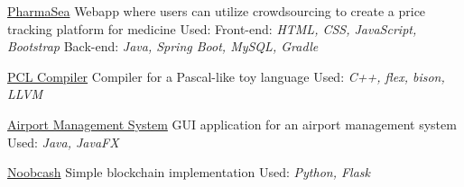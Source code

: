 \documentclass[11pt,a4paper,sans]{moderncv} %
\begin{document}
\cventry{}
{\href{https://github.com/Nickgraviton/pharmasea}{PharmaSea}}
{\newline Webapp where users can utilize crowdsourcing to create a price tracking platform for medicine}
{\newline Used:
\newline Front-end: \emph{HTML, CSS, JavaScript, Bootstrap}
\newline Back-end: \emph{Java, Spring Boot, MySQL, Gradle}}{}{}

\cventry{}
{\href{https://github.com/Nickgraviton/pcl-compiler}{PCL Compiler}}
{\newline Compiler for a Pascal-like toy language}
{\newline Used: \emph{C++, flex, bison, LLVM}}{}{}

\cventry{}
{\href{https://github.com/Nickgraviton/airport-management-system}{Airport Management System}}
{\newline GUI application for an airport management system}
{\newline Used: \emph{Java, JavaFX}}{}{}

\cventry{}
{\href{https://github.com/Nickgraviton/noobcash}{Noobcash}}
{\newline Simple blockchain implementation}
{\newline Used: \emph{Python, Flask}}{}{}



\end{document}
